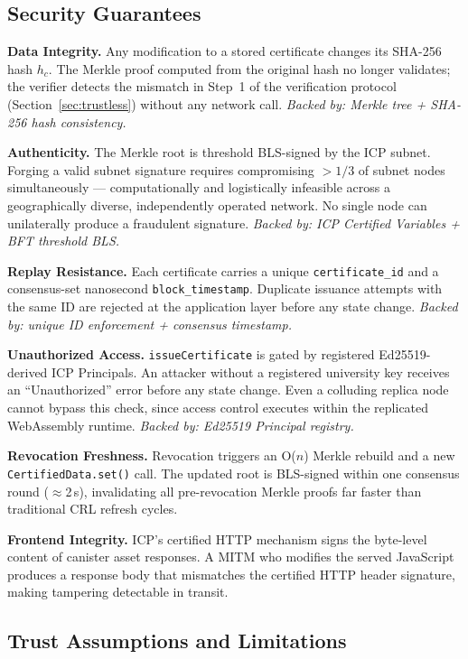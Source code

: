 \documentclass[conference]{IEEEtran}
\begin{document}
\subsection{Security Guarantees}

\textbf{Data Integrity.} Any modification to a stored certificate changes its SHA-256 hash $h_c$. The Merkle proof computed from the original hash no longer validates; the verifier detects the mismatch in Step~1 of the verification protocol (Section~\ref{sec:trustless}) without any network call. \textit{Backed by: Merkle tree + SHA-256 hash consistency.}

\textbf{Authenticity.} The Merkle root is threshold BLS-signed by the ICP subnet. Forging a valid subnet signature requires compromising $>1/3$ of subnet nodes simultaneously — computationally and logistically infeasible across a geographically diverse, independently operated network. No single node can unilaterally produce a fraudulent signature. \textit{Backed by: ICP Certified Variables + BFT threshold BLS.}

\textbf{Replay Resistance.} Each certificate carries a unique \texttt{certificate\_id} and a consensus-set nanosecond \texttt{block\_timestamp}. Duplicate issuance attempts with the same ID are rejected at the application layer before any state change. \textit{Backed by: unique ID enforcement + consensus timestamp.}

\textbf{Unauthorized Access.} \texttt{issueCertificate} is gated by registered Ed25519-derived ICP Principals. An attacker without a registered university key receives an ``Unauthorized'' error before any state change. Even a colluding replica node cannot bypass this check, since access control executes within the replicated WebAssembly runtime. \textit{Backed by: Ed25519 Principal registry.}

\textbf{Revocation Freshness.} Revocation triggers an O($n$) Merkle rebuild and a new \texttt{CertifiedData.set()} call. The updated root is BLS-signed within one consensus round ($\approx$2\,s), invalidating all pre-revocation Merkle proofs far faster than traditional CRL refresh cycles.

\textbf{Frontend Integrity.} ICP's certified HTTP mechanism signs the byte-level content of canister asset responses. A MITM who modifies the served JavaScript produces a response body that mismatches the certified HTTP header signature, making tampering detectable in transit.

\subsection{Trust Assumptions and Limitations}
\end{document}
